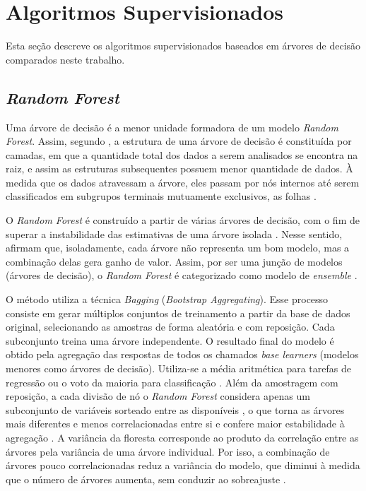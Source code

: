 \documentclass{uflamon}          %
\begin{document}
\section{Algoritmos Supervisionados}

Esta seção descreve os algoritmos supervisionados baseados em árvores de decisão comparados neste trabalho.

\subsection{\texorpdfstring{\textit{Random Forest}}{Random Forest}}

Uma árvore de decisão é a menor unidade formadora de um modelo \textit{Random Forest}. Assim, segundo , a estrutura de uma árvore de decisão é constituída por camadas, em que a quantidade total dos dados a serem analisados se encontra na raiz, e assim as estruturas subsequentes possuem menor quantidade de dados. À medida que os dados atravessam a árvore, eles passam por nós internos até serem classificados em subgrupos terminais mutuamente exclusivos, as folhas \cite{west2016}. 

O \textit{Random Forest} é construído a partir de várias árvores de decisão, com o fim de superar a instabilidade das estimativas de uma árvore isolada \cite{biau2016}. Nesse sentido,  afirmam que, isoladamente, cada árvore não representa um bom modelo, mas a combinação delas gera ganho de valor. Assim, por ser uma junção de modelos (árvores de decisão), o \textit{Random Forest} é categorizado como modelo de \textit{ensemble} \cite{salman2024}.

O método utiliza a técnica \textit{Bagging} (\textit{Bootstrap Aggregating}). Esse processo consiste em gerar múltiplos conjuntos de treinamento a partir da base de dados original, selecionando as amostras de forma aleatória e com reposição. Cada subconjunto treina uma árvore independente. O resultado final do modelo é obtido pela agregação das respostas de todos os chamados \textit{base learners} (modelos menores como árvores de decisão). Utiliza-se a média aritmética para tarefas de regressão ou o voto da maioria para classificação \cite{salman2024}. Além da amostragem com reposição, a cada divisão de nó o \textit{Random Forest} considera apenas um subconjunto de variáveis sorteado entre as disponíveis \cite{biau2016}, o que torna as árvores mais diferentes e menos correlacionadas entre si e confere maior estabilidade à agregação \cite{probst2019}. A variância da floresta corresponde ao produto da correlação entre as árvores pela variância de uma árvore individual. Por isso, a combinação de árvores pouco correlacionadas reduz a variância do modelo, que diminui à medida que o número de árvores aumenta, sem conduzir ao sobreajuste \cite{biau2016}.
\end{document}

